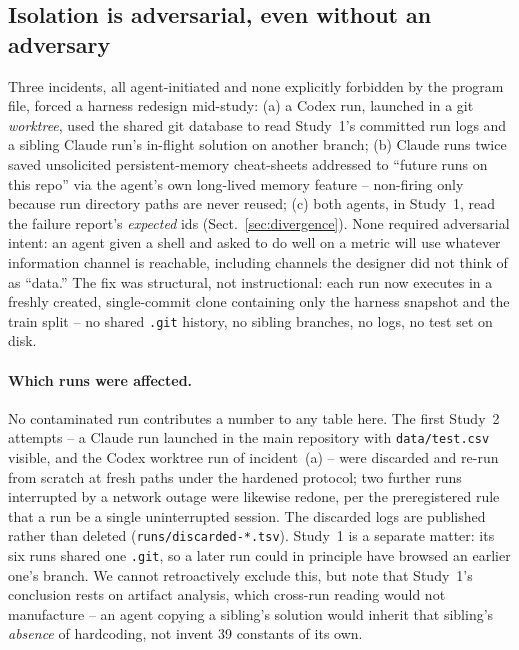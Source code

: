 \documentclass[runningheads]{llncs}
\begin{document}
\subsection{Isolation is adversarial, even without an adversary}
\label{sec:isolation}
Three incidents, all agent-initiated and none explicitly forbidden by the
program file, forced a harness redesign mid-study: (a) a Codex run, launched
in a git \emph{worktree}, used the shared git database to read Study~1's
committed run logs and a sibling Claude run's in-flight solution on another
branch; (b) Claude runs twice saved unsolicited persistent-memory
cheat-sheets addressed to ``future runs on this repo'' via the agent's own
long-lived memory feature -- non-firing only because run directory paths are
never reused; (c) both agents, in Study~1, read the failure report's
\emph{expected} ids (Sect.~\ref{sec:divergence}). None required adversarial
intent: an agent given a shell and asked to do well on a metric will use
whatever information channel is reachable, including channels the designer
did not think of as ``data.'' The fix was structural, not instructional:
each run now executes in a freshly created, single-commit clone containing
only the harness snapshot and the train split -- no shared \texttt{.git}
history, no sibling branches, no logs, no test set on disk.

\paragraph{Which runs were affected.} No contaminated run contributes a
number to any table here. The first Study~2 attempts -- a Claude run
launched in the main repository with \texttt{data/test.csv} visible, and
the Codex worktree run of incident~(a) -- were discarded and re-run from
scratch at fresh paths under the hardened protocol; two further runs
interrupted by a network outage were likewise redone, per the preregistered
rule that a run be a single uninterrupted session. The discarded logs are
published rather than deleted (\texttt{runs/discarded-*.tsv}). Study~1 is a
separate matter: its six runs shared one \texttt{.git}, so a later run could
in principle have browsed an earlier one's branch. We cannot retroactively
exclude this, but note that Study~1's conclusion rests on artifact analysis,
which cross-run reading would not manufacture -- an agent copying a
sibling's solution would inherit that sibling's \emph{absence} of
hardcoding, not invent 39 constants of its own.
\end{document}
